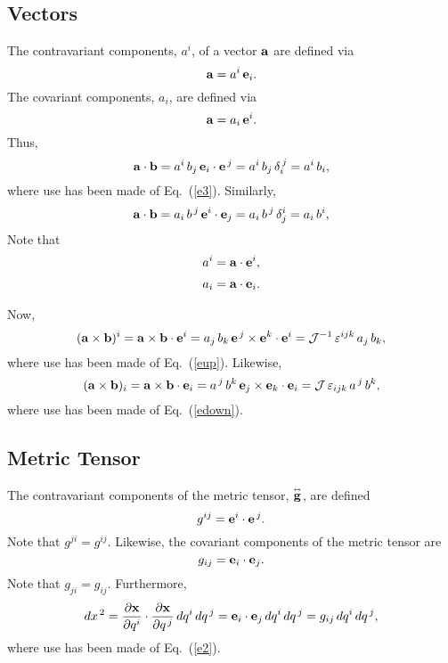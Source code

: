 \documentclass[12pt,prb,aps,notitlepage]{revtex4-1}
\newcommand{\smalltensor}[1]{\overset{\text{\tiny$\leftrightarrow$}}{#1}}
\begin{document}
\subsection{Vectors}
 The contravariant components, $a^i$,  of a vector ${\bf a}$ are defined via
 \begin{equation}
 {\bf a} = a^i\,{\bf e}_i.
 \end{equation}
 The covariant components, $a_i$, are defined via
 \begin{equation}
  {\bf a} = a_i\,{\bf e}^i.
  \end{equation}
  Thus,
  \begin{equation}
  {\bf a}\cdot{\bf b} = a^i\,b_j\,{\bf e}_i\cdot{\bf e}^{\,j} = a^i\,b_j\,\delta_i^{\,j} = a^i\,b_i,
  \end{equation}
  where use has been made of Eq.~(\ref{e3}). 
  Similarly, 
  \begin{equation}
  {\bf a}\cdot{\bf b} = a_i\,b^{\,j}\,{\bf e}^i\cdot{\bf e}_j = a_i\,b^{\,j}\,\delta^i_j = a_i\,b^i,
  \end{equation}
  Note that
  \begin{align}
  a^i &= {\bf a}\cdot{\bf e}^i,\\[0.5ex]
  a_i &= {\bf a}\cdot{\bf e}_i.
    \end{align}
    
 Now,
 \begin{equation}
 ({\bf a}\times{\bf b})^i = {\bf a}\times {\bf b}\cdot{\bf e}^i = a_j\,b_k\,{\bf e}^{\,j}\times{\bf e}^k\cdot{\bf e}^i ={\cal J}^{-1}\,\varepsilon^{ijk}\,a_j\,b_k,
 \end{equation}
 where use has been made of Eq.~(\ref{eup}). 
 Likewise, 
 \begin{equation}
 ({\bf a}\times{\bf b})_i = {\bf a}\times {\bf b}\cdot{\bf e}_i = a^{\,j}\,b^k\,{\bf e}_{j}\times{\bf e}_k\cdot{\bf e}_i={\cal J}\,\varepsilon_{ijk}\,a^{\,j}\,b^k,
 \end{equation}
 where use has been made of Eq.~(\ref{edown}). 

\subsection{Metric Tensor}  
 The contravariant components of the metric tensor, $\smalltensor{\bf g}$, are defined
 \begin{equation}
 g^{ij} = {\bf e}^i\cdot{\bf e}^{\,j}.
 \end{equation}
 Note that $g^{ji}=g^{ij}$. 
 Likewise, the covariant components of the metric tensor are  
 \begin{equation}
 g_{ij} = {\bf e}_i\cdot{\bf e}_j.
 \end{equation}
 Note that $g_{ji}= g_{ij}$. Furthermore,
 \begin{equation}
 dx^{\,2}= \frac{\partial {\bf x}}{\partial q^i}\cdot \frac{\partial {\bf x}}{\partial q^{\,j}}\,dq^i\,dq^{\,j} = {\bf e}_i\cdot{\bf e}_j\,dq^i\,dq^{\,j} = g_{ij}\,dq^i\,dq^{\,j},
 \end{equation}
 where use has been made of Eq.~(\ref{e2}). 
 
\end{document}
